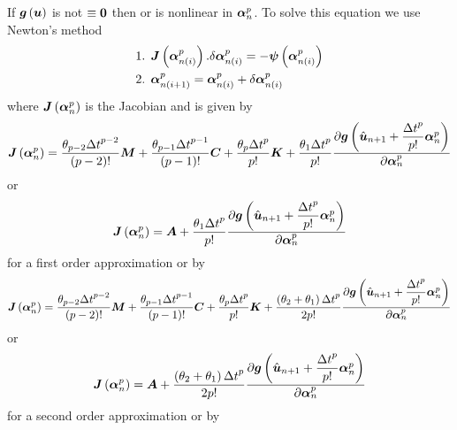 If $ \boldsymbol{g}\left( \boldsymbol{u} \right) $ is not $\equiv\boldsymbol{0}$ then
 or  is nonlinear in $\boldsymbol{\alpha}^{p}_{n}$. To solve this
equation we use Newton's method \ie
\begin{equation}
  \begin{split}
    \text{1.  } & \fnof{\matr{J}}{\vectr{\alpha}^{p}_{n(i)}}.\delta
    \vectr{\alpha}^{p}_{n(i)} = 
    -\fnof{\vectr{\psi}}{\vectr{\alpha}^{p}_{n(i)}} \\
    \text{2.  } & \vectr{\alpha}^{p}_{n(i+1)}=\vectr{\alpha}^{p}_{n(i)}+\delta
    \vectr{\alpha}^{p}_{n(i)}
  \end{split}
\end{equation}
where $\fnof{\matr{J}}{\vectr{\alpha}^{p}_{n}}$ is the Jacobian and is given by
\begin{equation}
  \fnof{\matr{J}}{\vectr{\alpha}^{p}_{n}}=\dfrac{\theta_{p-2}{\Delta t}^{p-2}}{\factorial{p-2}}\matr{M}+
  \dfrac{\theta_{p-1}{\Delta
      t}^{p-1}}{\factorial{p-1}}\matr{C}+\dfrac{\theta_{p}{\Delta t}^{p}}{p!}\matr{K}+
  \dfrac{\theta_{1}{\Delta t}^{p}}{p!}
  \delby{\fnof{\vectr{g}}{\hat{\vectr{u}}_{n+1}+\dfrac{{\Delta
          t}^{p}}{p!}
      \vectr{\alpha}^{p}_{n}}}{\vectr{\alpha}^{p}_{n}}
\end{equation}
or
\begin{equation}
  \fnof{\matr{J}}{\vectr{\alpha}^{p}_{n}}=\matr{A}+\dfrac{\theta_{1}{\Delta
      t}^{p}}{p!}
  \delby{\fnof{\vectr{g}}{\hat{\vectr{u}}_{n+1}+\dfrac{{\Delta t}^{p}}{p!}\vectr{\alpha}^{p}_{n}}}{\vectr{\alpha}^{p}_{n}}
\end{equation}
for a first order approximation or by
\begin{equation}
  \fnof{\matr{J}}{\vectr{\alpha}^{p}_{n}}=\dfrac{\theta_{p-2}{\Delta t}^{p-2}}{\factorial{p-2}}\matr{M}+
  \dfrac{\theta_{p-1}{\Delta
      t}^{p-1}}{\factorial{p-1}}\matr{C}+\dfrac{\theta_{p}{\Delta t}^{p}}{p!}\matr{K}+
  \dfrac{\pbrac{\theta_{2}+\theta_{1}}{\Delta t}^{p}}{2p!}
  \delby{\fnof{\vectr{g}}{\hat{\vectr{u}}_{n+1}+\dfrac{{\Delta
          t}^{p}}{p!}
      \vectr{\alpha}^{p}_{n}}}{\vectr{\alpha}^{p}_{n}}
\end{equation}
or
\begin{equation}
  \fnof{\matr{J}}{\vectr{\alpha}^{p}_{n}}=\matr{A}+\dfrac{\pbrac{\theta_{2}+\theta_{1}}{\Delta
      t}^{p}}{2p!}
  \delby{\fnof{\vectr{g}}{\hat{\vectr{u}}_{n+1}+\dfrac{{\Delta t}^{p}}{p!}\vectr{\alpha}^{p}_{n}}}{\vectr{\alpha}^{p}_{n}}
\end{equation}
for a second order approximation or by
